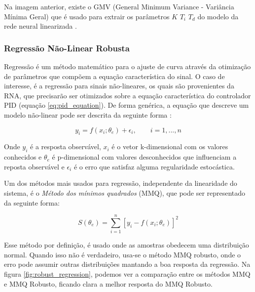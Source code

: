 Na imagem anterior, existe o GMV (General Minimum Variance - Variância Mínima Geral) que é usado para extrair os parâmetros $K$ $T_i$ $T_d$ do modelo da rede neural linearizada .



\subsubsection{Regressão Não-Linear Robusta}

Regressão é um método matemático para o ajuste de curva através da otimização de parâmetros que compõem a equação característica do sinal. O caso de interesse, é a regressão para sinais não-lineares, os quais são provenientes da RNA, que precisarão ser otimizados sobre a equação característica do controlador PID (equação \ref{eq:pid_equation}). De forma genérica, a equação que descreve um modelo não-linear pode ser descrita da seguinte forma \cite{robust2019}:

\begin{equation}
 y_i = f(x_i; \theta_e) + \epsilon_i, \quad\quad i = 1,...,n
\end{equation}

Onde $y_i$ é a resposta observável, $x_i$ é o vetor k-dimensional com os valores conhecidos e $\theta_e$ é p-dimensional com valores desconhecidos que influenciam a reposta observável e $\epsilon_i$ é o erro que satisfaz alguma regularidade estocástica. 

Um dos métodos mais usados para regressão, independente da linearidade do sistema, é o \textit{Método dos mínimos quadrados} (MMQ), que pode ser representado da seguinte forma:

\begin{equation}
 S(\theta_e) = \sum_{i=1}^{n}[y_i-f(x_i;\theta_e)]^2 
\end{equation}

Esse método por definição, é usado onde as amostras obedecem uma distribuição normal. Quando isso não é verdadeiro, usa-se o método MMQ robusto, onde o erro pode assumir outras distribuições mantando a boa resposta da regressão. Na figura \ref{fig:robust_regression}, podemos ver a comparação entre os métodos MMQ e MMQ Robusto, ficando clara a melhor resposta do MMQ Robusto.

